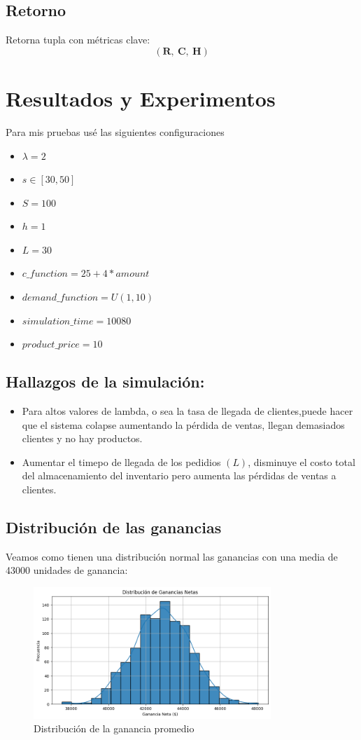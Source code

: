 \documentclass{article}
\begin{document}
\subsection*{Retorno}
Retorna tupla con métricas clave:
\[
(\mathbf{R},\ \mathbf{C},\ \mathbf{H})
\]

\section{Resultados y Experimentos}
Para mis pruebas usé las siguientes configuraciones
    \begin{itemize}
        \item $\lambda = 2$
        \item $s \in [30 , 50]$
        \item $S = 100$
        \item $h = 1$
        \item $L = 30 $
        \item $c\_function = 25 + 4 * amount$
        \item $demand\_function = U(1,10)$
        \item $simulation\_time = 10080$
        \item $product\_price = 10$
    \end{itemize}
\subsection{Hallazgos de la simulación:}
    \begin{itemize}
    \item Para altos valores de lambda, o sea la tasa de llegada de clientes,puede hacer que el sistema colapse aumentando la pérdida de ventas, llegan demasiados clientes y no hay productos.
    \item Aumentar el timepo de llegada de los pedidios  $(L)$, disminuye el costo total del almacenamiento del inventario pero aumenta las pérdidas de ventas a clientes.
    \end{itemize}

\subsection{Distribución de las ganancias}
Veamos como tienen una distribución normal las ganancias con una media de 43000 unidades de ganancia:

\begin{figure}[h]
    \centering
    \includegraphics[width=0.8\textwidth]{images/distribution.png}
    \caption{Distribución de la ganancia promedio}
\end{figure}
\end{document}
